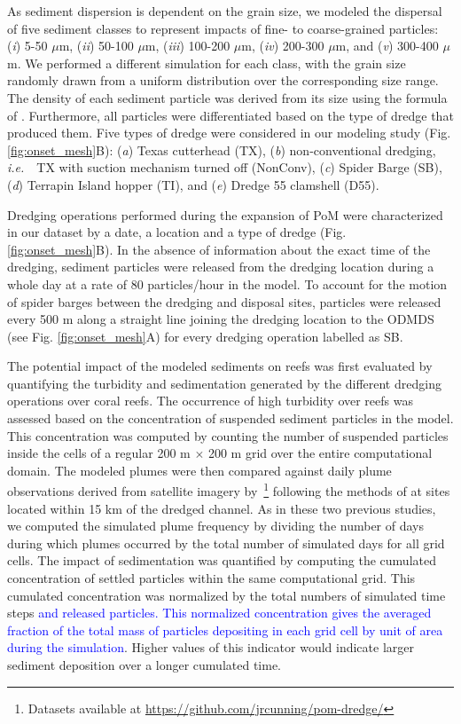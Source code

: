 \documentclass[preprint,12pt,authoryear]{elsarticle}
\newcommand{\ie}{{\it i.e.}\ }
\newcommand{\modif}[1]{\textcolor{blue}{#1}}
\begin{document}
As sediment dispersion is dependent on the grain size, we modeled the dispersal of five sediment classes to represent impacts of fine- to coarse-grained particles: (\textit{i}) 5-50 $\mu$m, (\textit{ii}) 50-100 $\mu$m, (\textit{iii}) 100-200 $\mu$m, (\textit{iv}) 200-300 $\mu$m, and (\textit{v}) 300-400 $\mu$m. We performed a  different simulation for each class, with the grain size randomly drawn from a uniform distribution over the corresponding size range. The density of each sediment particle was derived from its size using the formula of \cite{hamilton1982sound}. Furthermore, all particles were differentiated based on the type of dredge that produced them. Five types of dredge were considered in our modeling study (Fig. \ref{fig:onset_mesh}B): (\textit{a}) Texas cutterhead (TX), (\textit{b}) non-conventional dredging, \ie~TX with suction mechanism turned off (NonConv), (\textit{c}) Spider Barge (SB), (\textit{d}) Terrapin Island hopper (TI), and (\textit{e}) Dredge 55 clamshell (D55).

Dredging operations performed during the expansion of PoM were characterized in our dataset by a date, a location and  a type of dredge (Fig. \ref{fig:onset_mesh}B). In the absence of information about the exact time of the dredging, sediment particles were released from the dredging location during a whole day at a rate of 80 particles/hour in the model. To account for the motion of spider barges between the dredging and disposal sites, particles were released every 500 m along a straight line joining the dredging location to the ODMDS (see Fig. \ref{fig:onset_mesh}A) for every dredging operation labelled as SB.

The potential impact of the modeled sediments on reefs was first evaluated by quantifying the turbidity and sedimentation generated by the different dredging operations over coral reefs. The occurrence of high turbidity over reefs was assessed based on the concentration of suspended sediment particles in the model. This concentration was computed by counting the number of suspended particles inside the cells of a regular 200 m $\times$ 200 m grid over the entire computational domain. The modeled plumes were then compared against daily plume observations derived from satellite imagery by~\cite{cunning2019extensive}\footnote{Datasets available at \url{https://github.com/jrcunning/pom-dredge/}} following the methods of \cite{barnes2015sediment} at sites located within 15 km of the dredged channel. As in these two previous studies, we computed  the simulated plume frequency by dividing the number of days during which plumes occurred by the total number of simulated days for all grid cells. The impact of sedimentation was quantified by computing the cumulated concentration of settled particles within the same computational grid. This cumulated concentration was normalized by the total numbers of simulated time steps \modif{and released particles. This normalized concentration gives the averaged fraction of the total mass of particles depositing in each grid cell by unit of area during the simulation}. Higher values of this indicator would indicate larger sediment deposition over a longer cumulated time.
\end{document}
